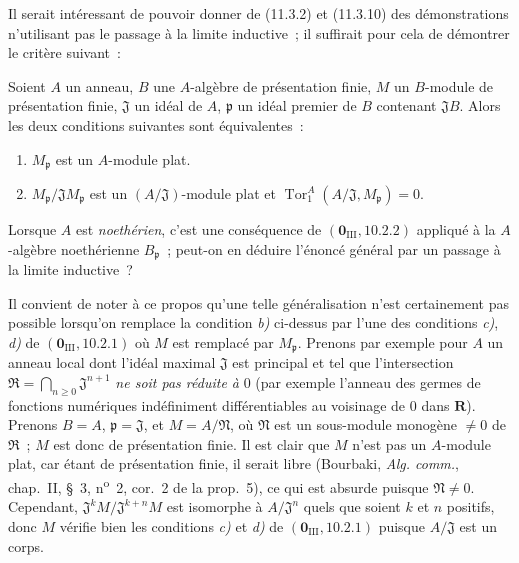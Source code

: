 \begin{remark}[11.3.12]
\label{IV.11.3.12-fr}
Il serait intéressant de pouvoir donner de (11.3.2) et (11.3.10) des
démonstrations n'utilisant pas le passage à la limite inductive~; il suffirait
pour cela de démontrer le critère suivant~:

Soient $A$ un anneau, $B$ une $A$-algèbre de présentation finie, $M$ un
$B$-module de présentation finie, $\mathfrak J$ un
idéal de $A$, $\mathfrak p$ un idéal premier de $B$ contenant $\mathfrak JB$.
Alors les deux conditions suivantes sont équivalentes~:
\begin{enumerate}[label=\emph{\alph*)}]
\item $M_\mathfrak p$ est un $A$-module plat.
\item $M_\mathfrak p/\mathfrak JM_\mathfrak p$ est un
$(A/\mathfrak J)$-module plat et
$\operatorname{Tor}_1^A(A/\mathfrak J,M_\mathfrak p)=0$.
\end{enumerate}

Lorsque $A$ est \emph{noethérien}, c'est une conséquence de
$(\mathbf 0_{\mathrm{III}},10.2.2)$ appliqué à la $A$-algèbre noethérienne
$B_\mathfrak p$~; peut-on en déduire l'énoncé général par un passage à la
limite inductive~?

Il convient de noter à ce propos qu'une telle généralisation n'est certainement
pas possible lorsqu'on remplace la condition \emph{b)} ci-dessus par l'une des
conditions \emph{c)}, \emph{d)} de $(\mathbf 0_{\mathrm{III}},10.2.1)$ où $M$ est remplacé
par $M_\mathfrak p$. Prenons par exemple pour $A$ un anneau local dont l'idéal
maximal $\mathfrak J$ est principal et tel que l'intersection $\mathfrak R=\bigcap_{n\geq0}\mathfrak J^{n+1}$
\emph{ne soit pas réduite à} $0$ (par exemple l'anneau des germes de fonctions
numériques indéfiniment différentiables au voisinage de $0$ dans $\mathbf R$).
Prenons $B=A$, $\mathfrak p=\mathfrak J$, et $M=A/\mathfrak N$, où
$\mathfrak N$ est un sous-module monogène $\neq0$ de $\mathfrak R$~; $M$ est
donc de présentation finie. Il est clair que $M$ n'est pas un $A$-module plat,
car étant de présentation finie, il serait libre (Bourbaki, \emph{Alg. comm.},
chap.~II, \S~3, n\textsuperscript{o}~2, cor.~2 de la prop.~5), ce qui est absurde puisque
$\mathfrak N\neq0$. Cependant, $\mathfrak J^kM/\mathfrak J^{k+n}M$ est isomorphe à $A/\mathfrak J^n$
quels que soient $k$ et $n$ positifs, donc $M$ vérifie bien les conditions \emph{c)}
et \emph{d)} de $(\mathbf 0_{\mathrm{III}},10.2.1)$ puisque $A/\mathfrak J$ est un
corps.
\end{remark}
